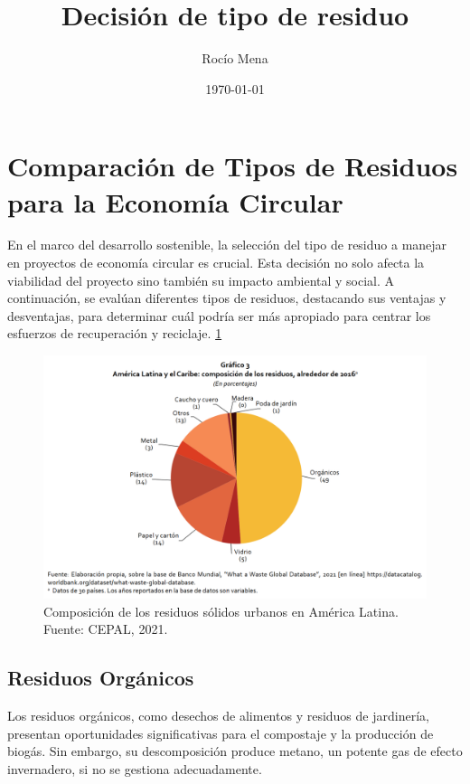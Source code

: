 \documentclass[main.tex]{subfiles}
\title{Decisión de tipo de residuo}
\author{Rocío Mena}
\date{\today}
\begin{document}
\maketitle

\section{Comparación de Tipos de Residuos para la Economía Circular}

En el marco del desarrollo sostenible, la selección del tipo de residuo a manejar en proyectos de economía circular es crucial. Esta decisión no solo afecta la viabilidad del proyecto \cite{baralla2023waste} sino también su impacto ambiental y social. A continuación, se evalúan diferentes tipos de residuos, destacando sus ventajas y desventajas, para determinar cuál podría ser más apropiado para centrar los esfuerzos de recuperación y reciclaje. \ref{fig:waste-latam}

\begin{figure}[h]
	\centering
	\includegraphics[width=1\textwidth]{./assets/waste-types-latam.png}
	\caption{Composición de los residuos sólidos urbanos en América Latina. Fuente: CEPAL, 2021.}
	\label{fig:waste-latam}
\end{figure}

\subsection{Residuos Orgánicos}
Los residuos orgánicos, como desechos de alimentos y residuos de jardinería, presentan oportunidades significativas para el compostaje y la producción de biogás. Sin embargo, su descomposición produce metano, un potente gas de efecto invernadero, si no se gestiona adecuadamente.
\end{document}
